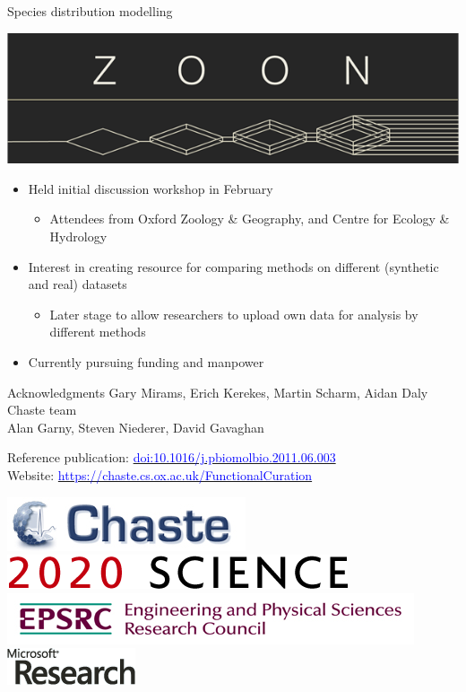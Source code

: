 \documentclass[t,xcolor={usenames,dvipsnames}]{beamer}
\newcommand{\myhref}[2]{\href{#1}{\textcolor{Blue}{#2}}}
\newcommand{\myurl}[1]{\myhref{#1}{#1}}
\newcommand{\subitem}[1]{\begin{itemize}[<.->]\item #1 \end{itemize}}
\newcommand{\doi}[1]{\myhref{http://dx.doi.org/#1}{doi:#1}}
\begin{document}
\begin{frame}{Species distribution modelling}
\begin{center}
\vspace{-.3cm}
\includegraphics[width=\textwidth]{zoon}
\end{center}
\begin{itemize}
\item Held initial discussion workshop in February
  \subitem{Attendees from Oxford Zoology \& Geography, and Centre for Ecology \& Hydrology}
\item Interest in creating resource for comparing methods on different (synthetic and real) datasets
  \subitem{Later stage to allow researchers to upload own data for analysis by different methods}
\item Currently pursuing funding and manpower
\end{itemize}
\end{frame}


\appendix

\begin{frame}{Acknowledgments}
Gary Mirams, Erich Kerekes, Martin Scharm, Aidan Daly\\
Chaste team\\
Alan Garny, Steven Niederer, David Gavaghan

Reference publication: \doi{10.1016/j.pbiomolbio.2011.06.003}\\
Website: \myurl{https://chaste.cs.ox.ac.uk/FunctionalCuration}

\begin{center}
\includegraphics[scale=.9]{chaste-266x60}\\ \vspace{.3cm}
\includegraphics[scale=.7]{logo2020science}\\ \vspace{.4cm}
\includegraphics[width=.55\textwidth]{EPSRC1RGBLO} \hspace{.1cm}
\includegraphics[scale=.55]{logo_msr}
\end{center}
\end{frame}
\end{document}
